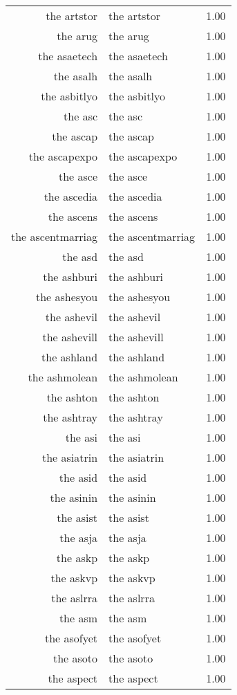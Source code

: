 \begin{table}[ht]
\begin{tabular}{rlr}
  the artstor & the artstor & 1.00 \\ 
  the arug & the arug & 1.00 \\ 
  the asaetech & the asaetech & 1.00 \\ 
  the asalh & the asalh & 1.00 \\ 
  the asbitlyo & the asbitlyo & 1.00 \\ 
  the asc & the asc & 1.00 \\ 
  the ascap & the ascap & 1.00 \\ 
  the ascapexpo & the ascapexpo & 1.00 \\ 
  the asce & the asce & 1.00 \\ 
  the ascedia & the ascedia & 1.00 \\ 
  the ascens & the ascens & 1.00 \\ 
  the ascentmarriag & the ascentmarriag & 1.00 \\ 
  the asd & the asd & 1.00 \\ 
  the ashburi & the ashburi & 1.00 \\ 
  the ashesyou & the ashesyou & 1.00 \\ 
  the ashevil & the ashevil & 1.00 \\ 
  the ashevill & the ashevill & 1.00 \\ 
  the ashland & the ashland & 1.00 \\ 
  the ashmolean & the ashmolean & 1.00 \\ 
  the ashton & the ashton & 1.00 \\ 
  the ashtray & the ashtray & 1.00 \\ 
  the asi & the asi & 1.00 \\ 
  the asiatrin & the asiatrin & 1.00 \\ 
  the asid & the asid & 1.00 \\ 
  the asinin & the asinin & 1.00 \\ 
  the asist & the asist & 1.00 \\ 
  the asja & the asja & 1.00 \\ 
  the askp & the askp & 1.00 \\ 
  the askvp & the askvp & 1.00 \\ 
  the aslrra & the aslrra & 1.00 \\ 
  the asm & the asm & 1.00 \\ 
  the asofyet & the asofyet & 1.00 \\ 
  the asoto & the asoto & 1.00 \\ 
  the aspect & the aspect & 1.00 \\ 

\end{tabular}
\end{table}
